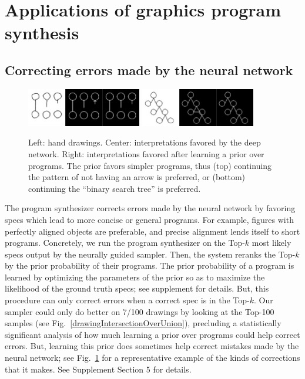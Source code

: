 \documentclass{article}
\theoremstyle{definition}
\begin{document}
\section{Applications of graphics program synthesis}\label{applicationsSection}

\subsection{Correcting errors made by the neural network}\label{synthesizerHelpsParsing}
\begin{figure}\vspace{-0.5cm}
  \includegraphics[width = 5cm]{figures/programSuccess7.png}
  \includegraphics[width = 5cm]{figures/programSuccess16.png}
  \caption{Left: hand drawings. Center: interpretations favored by the deep network. Right: interpretations favored after learning a prior over programs. The prior favors  simpler programs, thus (top) continuing the pattern of not having an arrow is preferred, or (bottom) continuing the ``binary search tree'' is preferred.}\label{exampleOfProgramCorrectingMistake}
\vspace{-0.75cm}  \end{figure}
The program synthesizer corrects errors made by the neural network by favoring specs which lead to more
concise or general programs.  For example, figures with perfectly aligned objects are preferable, %
and precise alignment lends itself to short
programs.
Concretely,
we run the program synthesizer on the
Top-$k$  most likely specs output by the neurally guided sampler.
Then, the system
reranks the Top-$k$  by  the prior probability of their programs.
The prior probability of a program is learned by optimizing the parameters of the prior so as to maximize
the likelihood of the ground truth specs;
see supplement for details.
But, this procedure can only correct errors when
a correct spec is in the Top-$k$.
Our sampler could only do better on
7/100 drawings by looking at the Top-100 samples
(see Fig.~\ref{drawingIntersectionOverUnion}),
precluding a statistically significant analysis of how much
learning a prior over programs could help correct errors.
But,
learning this prior does sometimes 
help correct mistakes made by the neural network; %
see
Fig.~\ref{exampleOfProgramCorrectingMistake} for a representative
example of the kinds of corrections that it makes.
See Supplement Section 5 for details.
\end{document}
